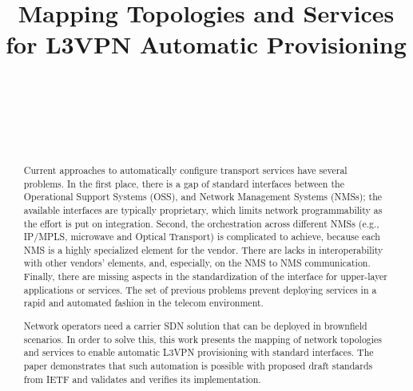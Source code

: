 \documentclass[conference]{IEEEtran}
\begin{document}
\title{Mapping Topologies and Services for L3VPN Automatic Provisioning}

\author{
\\
\and
{}
\\
\and
{}
\\
}

\maketitle

\begin{abstract}
Current approaches to automatically configure transport services have several problems.  In the first place, there is a gap of standard interfaces between the Operational Support Systems (OSS), and Network Management Systems (NMSs); the available interfaces are typically proprietary, which limits network programmability as the effort is put on integration. Second, the orchestration across different NMSs (e.g., IP/MPLS, microwave and Optical Transport) is complicated to achieve, because each NMS is a highly specialized element for the vendor. There are lacks in interoperability with other vendors’ elements, and, especially, on the NMS to NMS communication. Finally, there are missing aspects in the standardization of the interface for upper-layer applications or services. The set of previous problems prevent deploying services in a rapid and automated fashion in the telecom environment. 

Network operators need a carrier SDN solution that can be deployed in brownfield scenarios. In order to solve this, this work presents the mapping of network topologies and services to enable automatic L3VPN provisioning with standard interfaces. The paper demonstrates that such automation is possible with proposed draft standards from IETF and validates and verifies its implementation.
\end{abstract}
\end{document}
